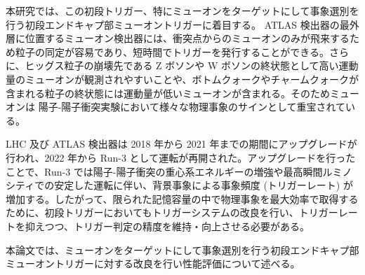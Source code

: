 本研究では、この初段トリガー、特にミューオンをターゲットにして事象選別を行う初段エンドキャプ部ミューオントリガーに着目する。
ATLAS 検出器の最外層に位置するミューオン検出器には、衝突点からのミューオンのみが飛来するため粒子の同定が容易であり、短時間でトリガーを発行することができる。さらに、ヒッグス粒子の崩壊先である Z ボソンや W ボソンの終状態として高い運動量のミューオンが観測されやすいことや、ボトムクォークやチャームクォークが含まれる粒子の終状態には運動量が低いミューオンが含まれる。そのためミューオンは 陽子-陽子衝突実験において様々な物理事象のサインとして重宝されている。

LHC 及び ATLAS 検出器は 2018 年から 2021 年までの期間にアップグレードが行われ、2022 年から Run-3 として運転が再開された。アップグレードを行ったことで、Run-3 では陽子-陽子衝突の重心系エネルギーの増強や最高瞬間ルミノシティでの安定した運転に伴い、背景事象による事象頻度 (トリガーレート) が増加する。したがって、限られた記憶容量の中で物理事象を最大効率で取得するために、初段トリガーにおいてもトリガーシステムの改良を行い、トリガーレートを抑えつつ、トリガー判定の精度を維持・向上させる必要がある。

本論文では、ミューオンをターゲットにして事象選別を行う初段エンドキャプ部ミューオントリガーに対する改良を行い性能評価について述べる。






